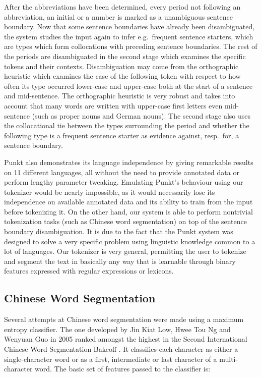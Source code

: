 After the abbreviations have been determined, every period not following an
abbreviation, an initial or a number is marked as a unambiguous sentence
boundary. Now that some sentence boundaries have already been disambiguated,
the system studies the input again to infer e.g.\ frequent sentence starters,
which are types which form collocations with preceding sentence boundaries. The
rest of the periods are disambiguated in the second stage which examines the
specific tokens and their contexts. Disambiguation may come from the
orthographic heuristic which examines the case of the following token with
respect to how often its type occurred lower-case and upper-case both at the
start of a sentence and mid-sentence. The orthographic heuristic is very robust
and takes into account that many words are written with upper-case first
letters even mid-sentence (such as proper nouns and German nouns). The second
stage also uses the collocational tie between the types surrounding the period
and whether the following type is a frequent sentence starter as evidence
against, resp.\ for, a sentence boundary.

Punkt also demonstrates its language independence by giving remarkable results
on 11 different languages, all without the need to provide annotated data or
perform lengthy parameter tweaking. Emulating Punkt's behaviour using our
tokenizer would be nearly impossible, as it would necessarily lose its
independence on available annotated data and its ability to train from the
input before tokenizing it. On the other hand, our system is able to perform
nontrivial tokenization tasks (such as Chinese word segmentation) on top of the
sentence boundary disambiguation. It is due to the fact that the Punkt system
was designed to solve a very specific problem using linguistic knowledge common
to a lot of languages. Our tokenizer is very general, permitting the user to
tokenize and segment the text in basically any way that is learnable through
binary features expressed with regular expressions or lexicons.

\subsection{Chinese Word Segmentation}
\label{survey-chinese}

Several attempts at Chinese word segmentation were made using a maximum entropy
classifier. The one developed by Jin Kiat Low, Hwee Tou Ng and Wenyuan Guo in
2005 \cite{seg-chinese-maxent} ranked amongst the highest in the Second
International Chinese Word Segmentation Bakeoff \cite{web-bakeoff}. It
classifies each character as either a single-character word or as a first,
intermediate or last character of a multi-character word. The basic set of
features passed to the classifier is:

